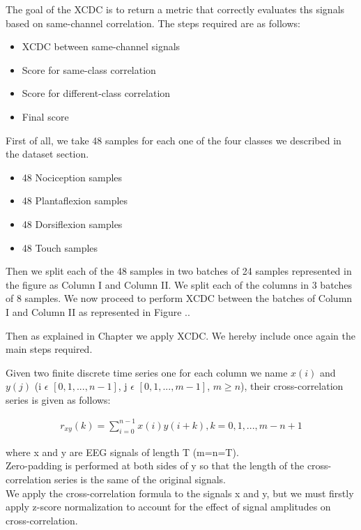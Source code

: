 \documentclass{Configuration_Files/PoliMi3i_thesis}
\begin{document}
The goal of the XCDC is to return a metric that correctly evaluates ths signals based on same-channel correlation.
The steps required are as follows:
\begin{itemize}
	\item XCDC between same-channel signals
	\item Score for same-class correlation
	\item Score for different-class correlation
	\item Final score
\end{itemize}

First of all, we take 48 samples for each one of the four classes we described in the dataset section.

\begin{itemize}
	\item 48 Nociception samples
	\item 48 Plantaflexion samples
	\item 48 Dorsiflexion samples
	\item 48 Touch samples
\end{itemize}

Then we split each of the 48 samples in two batches of 24 samples represented in the figure as Column I and Column II.
We split each of the columns in 3 batches of 8 samples.
We now proceed to perform XCDC between the batches of Column I and Column II as represented in Figure ..

Then as explained in Chapter we apply XCDC.
We hereby include once again the main steps required.

Given two finite discrete time series one for each column we name $x(i)$ and $y(j)$
(i $\epsilon$ $[0, 1, . . . , n - 1]$, j $\epsilon$ $[0, 1, . . . , m - 1]$, $m \geq n$),
their cross-correlation series is given as follows:

\begin{align}
	 r_{xy}(k) = \sum_{i=0}^{n-1}x(i)y(i + k), k = 0,1,...,m-n+1
	\label{eq:XCDC1}
\end{align}

where x and y are EEG signals of length T (m=n=T). \\ 
Zero-padding is performed at both sides of y so that the length of the cross-correlation series is the same of the original signals. \\
We apply the cross-correlation formula to the signals x and y, but we must firstly apply z-score normalization to account for the effect of signal amplitudes on cross-correlation.
\end{document}
